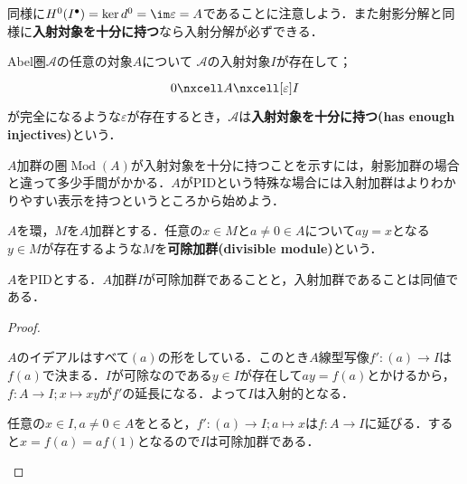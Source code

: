 同様に$H^0(I^\bullet)=\ker d^0=\im\varepsilon=A$であることに注意しよう．また射影分解と同様に\textbf{入射対象を十分に持つ}なら入射分解が必ずできる．


\begin{defi}
	Abel圏$\mathscr{A}$の任意の対象$A$について $\mathscr{A}$の入射対象$I$が存在して；
	\[\begin{tikzcd}
		0\nxcell A\nxcell[\varepsilon]I
	\end{tikzcd}\]
	が完全になるような$\varepsilon$が存在するとき，$\mathscr{A}$は\textbf{入射対象を十分に持つ(has enough injectives)}という．
\end{defi}

$A$加群の圏$\operatorname{Mod}(A)$が入射対象を十分に持つことを示すには，射影加群の場合と違って多少手間がかかる．$A$がPIDという特殊な場合には入射加群はよりわかりやすい表示を持つというところから始めよう．
\begin{defi}[可除加群]
	$A$を環，$M$を$A$加群とする．任意の$x\in M$と$a\neq0\in A$について$ay=x$となる$y\in M$が存在するような$M$を\textbf{可除加群(divisible module)}という．
\end{defi}

\begin{prop}
	$A$をPIDとする．$A$加群$I$が可除加群であることと，入射加群であることは同値である．
\end{prop}

\begin{proof}
	\begin{eqv}
		\item $A$のイデアルはすべて$(a)$の形をしている．このとき$A$線型写像$f':(a)\to I$は$f(a)$で決まる．$I$が可除なのである$y\in I$が存在して$ay=f(a)$とかけるから，$f:A\to I;x\mapsto xy$が$f'$の延長になる．よって$I$は入射的となる．
		
		\item 任意の$x\in I,a\neq0\in A$をとると，$f':(a)\to I;a\mapsto x$は$f:A\to I$に延びる．すると$x=f(a)=af(1)$となるので$I$は可除加群である．
	\end{eqv}
\end{proof}

